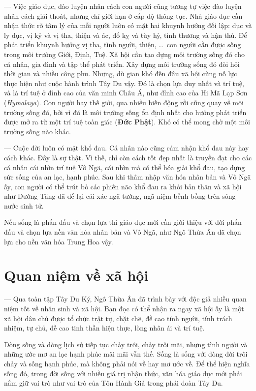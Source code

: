 — Việc giáo dục, đào luyện nhân cách con người cũng tương tự việc đào luyện nhân cách giải thoát, nhưng chỉ giới hạn ở cấp độ thông tục. Nhà giáo dục cần nhận thức rõ tâm lý của mỗi người luôn có mặt hai khuynh hướng đối lập: dục và ly dục, vị kỷ và vị tha, thiện và ác, đố kỵ và tùy hỷ, tình thương và hận thù. Để phát triển khuynh hướng vị tha, tình người, thiện, \ldots ~con người cần được sống trong môi trường Giới, Định, Tuệ. Xã hội cần tạo dựng môi trường sống đó cho cá nhân, gia đình và tập thể phát triển. Xây dựng môi trường sống đó đòi hỏi thời gian và nhiều công phu. Nhưng, dù gian khó đến đâu xã hội cũng nỗ lực thực hiện như cuộc hành trình Tây Du vậy. Đó là chọn lựa duy nhất và trí tuệ, và là trí tuệ ở đỉnh cao của văn minh Châu Á, như đỉnh cao của Hi Mã Lạp Sơn (\emph{Hymalaya}). Con người hay thế giới, qua nhiều biến động rồi cũng quay về môi trường sống đó, bởi vì đó là môi trường sống ổn định nhất cho hướng phát triển được mở ra từ một trí tuệ toàn giác ({\bf Đức Phật}). Khó có thể mong chờ một môi trường sống nào khác.

— Cuộc đời luôn có mặt khổ đau. Cá nhân nào cũng cảm nhận khổ đau này hay cách khác. Đây là sự thật. Vì thế, chỉ còn cách tốt đẹp nhất là truyền đạt cho các cá nhân cái nhìn trí tuệ Vô Ngã, cái nhìn mà có thể hóa giải khổ đau, tạo dựng sức sống của an lạc, hạnh phúc. Sau khi thâm nhập văn hóa nhân bản và Vô Ngã ấy, con người có thể trút bỏ các phiền não khổ đau ra khỏi bản thân và xã hội như Đường Tăng đã để lại cái xác ngã tướng, ngã niệm bềnh bồng trên sóng nước sinh tử.

Nếu sống là phấn đấu và chọn lựa thì giáo dục mới cần giới thiệu với đời phấn đấu và chọn lựa nền văn hóa nhân bản và Vô Ngã, như Ngô Thừa Ân đã chọn lựa cho nền văn hóa Trung Hoa vậy.

\section{Quan niệm về xã hội} %
\label{sec:98_99_100_xa_hoi}

— Qua toàn tập Tây Du Ký, Ngô Thừa Ân đã trình bày với độc giả nhiều quan niệm tốt về nhân sinh và xã hội. Bạn đọc có thể nhận ra ngay xã hội ấy là một xã hội dân chủ được tổ chức trật tự, chặt chẽ, đề cao tính người, tính trách nhiệm, tự chủ, đề cao tinh thần hiện thực, lòng nhân ái và trí tuệ.

\hrulefill

Dòng sống và dòng lịch sử tiếp tục chảy trôi, chảy trôi mãi, nhưng tình người và những ước mơ an lạc hạnh phúc mãi mãi vẫn thế. Sống là sống với dòng đời trôi chảy và sống hạnh phúc, mà không phải nói về hay mơ ước về. Để thể hiện nghĩa sống đó, trong đời sống với nhiều giá trị nhận thức, văn hóa giáo dục mới phải nắm giữ vai trò như vai trò của Tôn Hành Giả trong phái đoàn Tây Du.

\afterpage{\blankpage}